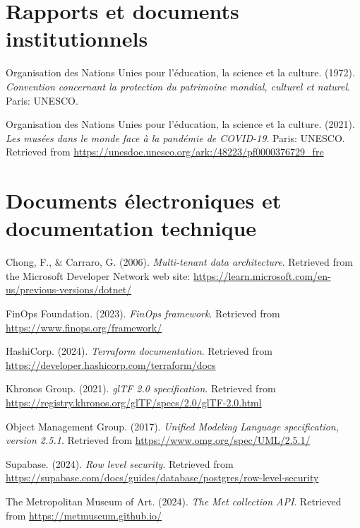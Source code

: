 \section*{Rapports et documents institutionnels}

\begin{apalist}
\item Organisation des Nations Unies pour l'éducation, la science et la culture.
      (1972). \emph{Convention concernant la protection du patrimoine mondial,
      culturel et naturel}. Paris: UNESCO.

\item Organisation des Nations Unies pour l'éducation, la science et la culture.
      (2021). \emph{Les musées dans le monde face à la pandémie de COVID-19}.
      Paris: UNESCO. Retrieved from
      \url{https://unesdoc.unesco.org/ark:/48223/pf0000376729_fre}
\end{apalist}

\section*{Documents électroniques et documentation technique}

\begin{apalist}
\item Chong, F., \& Carraro, G. (2006). \emph{Multi-tenant data architecture}.
      Retrieved from the Microsoft Developer Network web site:
      \url{https://learn.microsoft.com/en-us/previous-versions/dotnet/}

\item FinOps Foundation. (2023). \emph{FinOps framework}. Retrieved from
      \url{https://www.finops.org/framework/}

\item HashiCorp. (2024). \emph{Terraform documentation}. Retrieved from
      \url{https://developer.hashicorp.com/terraform/docs}

\item Khronos Group. (2021). \emph{glTF 2.0 specification}. Retrieved from
      \url{https://registry.khronos.org/glTF/specs/2.0/glTF-2.0.html}

\item Object Management Group. (2017). \emph{Unified Modeling Language
      specification, version 2.5.1}. Retrieved from
      \url{https://www.omg.org/spec/UML/2.5.1/}

\item Supabase. (2024). \emph{Row level security}. Retrieved from
      \url{https://supabase.com/docs/guides/database/postgres/row-level-security}

\item The Metropolitan Museum of Art. (2024). \emph{The Met collection API}.
      Retrieved from \url{https://metmuseum.github.io/}
\end{apalist}

